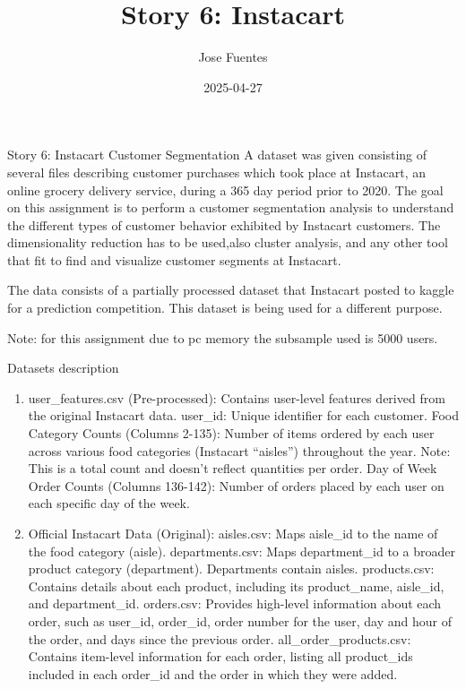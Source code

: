 \documentclass[
  ignorenonframetext,
]{beamer}
\title{Story 6: Instacart}
\author{Jose Fuentes}
\date{2025-04-27}
\providecommand{\tightlist}{%
  \setlength{\itemsep}{0pt}\setlength{\parskip}{0pt}}
\begin{document}
\frame{\titlepage}

\begin{frame}{Story 6: Instacart Customer Segmentation}
\label{story-6-instacart-customer-segmentation}
A dataset was given consisting of several files describing customer
purchases which took place at Instacart, an online grocery delivery
service, during a 365 day period prior to 2020. The goal on this
assignment is to perform a customer segmentation analysis to understand
the different types of customer behavior exhibited by Instacart
customers. The dimensionality reduction has to be used,also cluster
analysis, and any other tool that fit to find and visualize customer
segments at Instacart.

The data consists of a partially processed dataset that Instacart posted
to kaggle for a prediction competition. This dataset is being used for a
different purpose.

Note: for this assignment due to pc memory the subsample used is 5000
users.
\end{frame}

\begin{frame}{Datasets description}
\label{datasets-description}
\begin{enumerate}
\tightlist
\item
  user\_features.csv (Pre-processed): Contains user-level features
  derived from the original Instacart data. user\_id: Unique identifier
  for each customer. Food Category Counts (Columns 2-135): Number of
  items ordered by each user across various food categories (Instacart
  ``aisles'') throughout the year. Note: This is a total count and
  doesn't reflect quantities per order. Day of Week Order Counts
  (Columns 136-142): Number of orders placed by each user on each
  specific day of the week.
\item
  Official Instacart Data (Original): aisles.csv: Maps aisle\_id to the
  name of the food category (aisle). departments.csv: Maps
  department\_id to a broader product category (department). Departments
  contain aisles. products.csv: Contains details about each product,
  including its product\_name, aisle\_id, and department\_id.
  orders.csv: Provides high-level information about each order, such as
  user\_id, order\_id, order number for the user, day and hour of the
  order, and days since the previous order. all\_order\_products.csv:
  Contains item-level information for each order, listing all
  product\_ids included in each order\_id and the order in which they
  were added.
\end{enumerate}
\end{frame}
\end{document}
